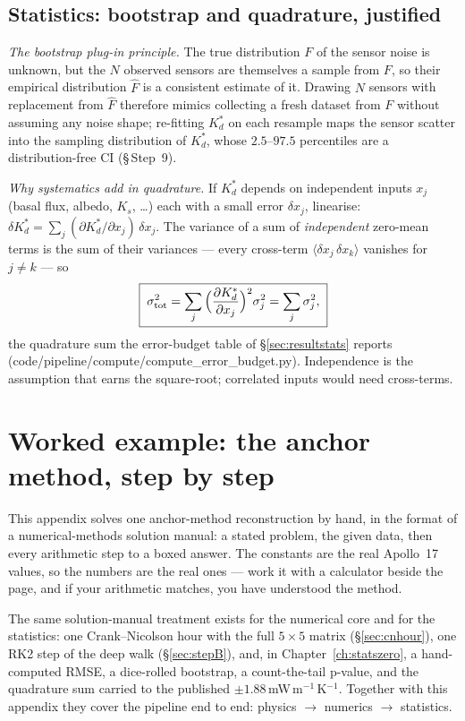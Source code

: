 \documentclass[11pt]{report}
\newcommand{\code}[1]{{\ttfamily\small #1}}
\begin{document}
\section{Statistics: bootstrap and quadrature, justified}\label{app:stats}
\emph{The bootstrap plug-in principle.} The true distribution $F$ of the
sensor noise is unknown, but the $N$ observed sensors are themselves a sample from
$F$, so their empirical distribution $\widehat F$ is a consistent estimate of it.
Drawing $N$ sensors with replacement from $\widehat F$ therefore mimics
collecting a fresh dataset from $F$ without assuming any noise shape; re-fitting
$K_d^{*}$ on each resample maps the sensor scatter into the sampling distribution
of $K_d^{*}$, whose $2.5$--$97.5$ percentiles are a distribution-free CI
(\S\,Step~9).

\emph{Why systematics add in quadrature.} If $K_d^{*}$ depends on independent
inputs $x_j$ (basal flux, albedo, $K_s$, \ldots) each with a small error
$\delta x_j$, linearise: $\delta K_d^{*}=\sum_j(\partial K_d^{*}/\partial x_j)\,
\delta x_j$. The variance of a sum of \emph{independent} zero-mean terms is the
sum of their variances --- every cross-term $\langle\delta x_j\,\delta
x_k\rangle$ vanishes for $j\neq k$ --- so
\[
\boxed{\;\sigma_{\rm tot}^2=\sum_j\Big(\frac{\partial K_d^{*}}{\partial x_j}\Big)^2
\sigma_j^2=\sum_j\sigma_j^2,\;}
\]
the quadrature sum the error-budget table of \S\ref{sec:resultstats} reports
(\code{code/pipeline/compute/compute\_error\_budget.py}). Independence is the
assumption that earns the square-root; correlated inputs would need cross-terms.

\chapter{Worked example: the anchor method, step by step}\label{app:worked}

\begin{plain}
This appendix solves one anchor-method reconstruction by hand, in the format of a
numerical-methods solution manual: a stated problem, the given data, then every
arithmetic step to a boxed answer. The constants are the real Apollo~17 values, so
the numbers are the real ones --- work it with a calculator beside the page, and if
your arithmetic matches, you have understood the method.
\end{plain}

\noindent The same solution-manual treatment exists for the numerical core and
for the statistics: one Crank--Nicolson hour with the full $5\times5$ matrix
(\S\ref{sec:cnhour}), one RK2 step of the deep walk (\S\ref{sec:stepB}), and,
in Chapter~\ref{ch:statszero}, a hand-computed RMSE, a dice-rolled bootstrap,
a count-the-tail p-value, and the quadrature sum carried to the published
$\pm1.88$\,mW\,m$^{-1}$\,K$^{-1}$. Together with this appendix they cover the
pipeline end to end: physics $\rightarrow$ numerics $\rightarrow$ statistics.
\end{document}
